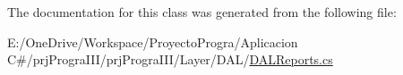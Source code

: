 The documentation for this class was generated from the following file\+:\begin{DoxyCompactItemize}
\item 
E\+:/\+One\+Drive/\+Workspace/\+Proyecto\+Progra/\+Aplicacion C\#/prj\+Progra\+I\+I\+I/prj\+Progra\+I\+I\+I/\+Layer/\+D\+A\+L/\hyperlink{_d_a_l_reports_8cs}{D\+A\+L\+Reports.\+cs}\end{DoxyCompactItemize}
